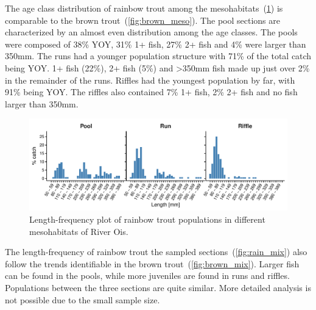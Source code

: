 The age class distribution of rainbow trout among the mesohabitats~(\cref{fig:rain_meso}) is comparable to the brown trout~(\cref{fig:brown_meso}).
The pool sections are characterized by an almost even distribution among the age classes.
The pools were composed of 38\% YOY, 31\% 1+ fish, 27\% 2+ fish and 4\% were larger than 350mm.
The runs had a younger population structure with 71\% of the total catch being YOY. 1+ fish (22\%), 2+ fish (5\%) and \textgreater350mm fish made up just over 2\% in the remainder of the runs.
Riffles had the youngest population by far, with 91\% being YOY.
The riffles also contained 7\% 1+ fish, 2\% 2+ fish and no fish larger than 350mm.

\begin{figure}[!htb]                              %
	\center
	\includegraphics[width=\textwidth]{images/rain_meso.pdf}                %
	\caption{Length-frequency plot of rainbow trout populations in different mesohabitats of River Ois.}        %
	\label{fig:rain_meso}                                                       %
\end{figure}

The length-frequency of rainbow trout the sampled sections~(\cref{fig:rain_mix}) also follow the trends identifiable in the brown trout~(\cref{fig:brown_mix}).
Larger fish can be found in the pools, while more juveniles are found in runs and riffles.
Populations between the three sections are quite similar.
More detailed analysis is not possible due to the small sample size.

